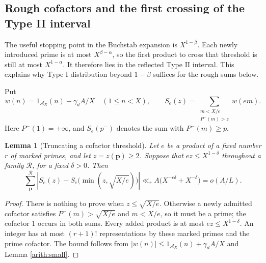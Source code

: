 \documentclass[11pt,a4paper]{article}
\theoremstyle{paperplain}
\newtheorem{lemma}[theorem]{Lemma}
\numberwithin{equation}{section}
\begin{document}
\subsection{Rough cofactors and the first crossing of the Type II interval}

The useful stopping point in the Buchstab expansion is $X^{1-\beta}$.
Each newly introduced prime is at most $X^{\beta-\alpha}$, so the first
product to cross that threshold is still at most $X^{1-\alpha}$.
It therefore lies in the reflected Type II interval. This explains why
Type I distribution beyond $1-\beta$ suffices for the rough sums below.

Put
\[
 w(n)=1_{\mathcal A_X}(n)-\gamma_d A/X\quad(1\le n<X),
 \qquad S_e(z)=\sum_{\substack{m<X/e\\P^-(m)>z}}w(em).
\]
Here $P^-(1)=+\infty$, and $S_e(p^-)$ denotes the sum with $P^-(m)\ge p$.

\begin{lemma}[Truncating a cofactor threshold]\label{arith:threshold}
Let $e$ be a product of a fixed number $r$ of marked primes, and let
$z=z(\boldsymbol p)\ge2$. Suppose that $ez\le X^{1-\delta}$ throughout
a family $\mathcal R$, for a fixed $\delta>0$. Then
\[
 \sum_{\boldsymbol p}^{\mathcal R}
 \left|S_e(z)-S_e\bigl(\min(z,\sqrt{X/e})\bigr)\right|
 \ll_r A\bigl(X^{-c\delta}+X^{-\delta}\bigr)=o(A/L).
\]
\end{lemma}
\begin{proof}
There is nothing to prove when $z\le\sqrt{X/e}$.
Otherwise a newly admitted cofactor satisfies
$P^-(m)>\sqrt{X/e}$ and $m<X/e$, so it must be a prime;
the cofactor $1$ occurs in both sums.
Every added product is at most $ez\le X^{1-\delta}$.
An integer has at most $(r+1)!$ representations by these marked
primes and the prime cofactor. The bound follows from
$|w(n)|\le1_{\mathcal A_X}(n)+\gamma_dA/X$ and
Lemma \ref{arith:small}.
\end{proof}
\end{document}

